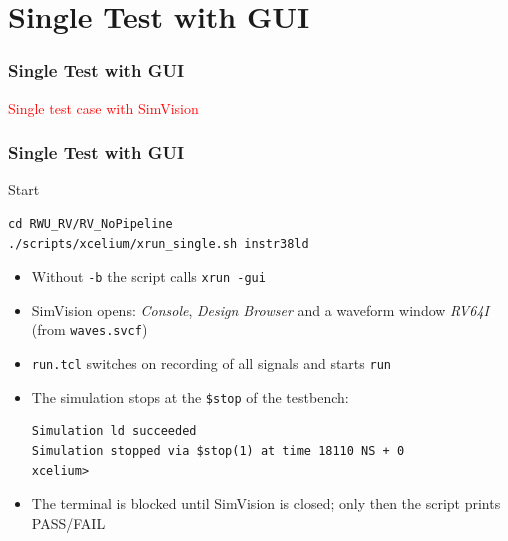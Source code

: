 \documentclass{beamer}
\newcommand{\astitle}{nix}
\newcommand{\assubtitle}{nix}
\newcommand{\cmd}[1]{\texttt{#1}}
\begin{document}
\section{Single Test with GUI}
\renewcommand{\astitle}{Single Test with GUI}
\begin{frame}
\frametitle{\astitle}
\textcolor{red}{Single test case with SimVision}
\end{frame}

\renewcommand{\assubtitle}{Start}
\begin{frame}[fragile]
\frametitle{\astitle}
\begin{block}{\assubtitle}
\begin{lstlisting}[style=sh,basicstyle=\ttfamily\small]
cd RWU_RV/RV_NoPipeline
./scripts/xcelium/xrun_single.sh instr38ld
\end{lstlisting}
  \begin{itemize}
    \item Without \cmd{-b} the script calls \cmd{xrun -gui}
    \item SimVision opens: \emph{Console}, \emph{Design Browser} and a waveform
      window \emph{RV64I} (from \cmd{waves.svcf})
    \item \cmd{run.tcl} switches on recording of all signals and starts \cmd{run}
    \item The simulation stops at the \cmd{\$stop} of the testbench:
\begin{lstlisting}
Simulation ld succeeded
Simulation stopped via $stop(1) at time 18110 NS + 0
xcelium>
\end{lstlisting}
    \item The terminal is blocked until SimVision is closed;
      only then the script prints PASS/FAIL
  \end{itemize}
\end{block}
\end{frame}
\end{document}
